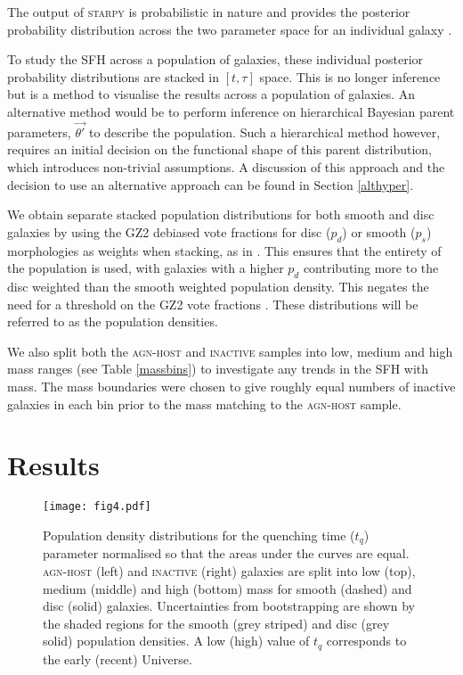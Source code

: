 \documentclass[useAMS,usenatbib]{mn2e}
\def\changed    {\color{nc} }
\def\changedbds    {\color{ncc} }
\def\secondchange    {\color{srv} }
\def\newref    {\color{new} }
\def\starpy ~{\textsc{starpy}}
\begin{document}
The output of \starpy  ~ is probabilistic in nature and provides the posterior probability distribution across the two parameter space for an individual galaxy {\newref \citep[the degeneracies for which can be seen in Figure 4 of]{Sme15} }. {\changed To study the SFH across a population of galaxies, these individual posterior probability distributions are {\secondchange stacked in $[t, \tau]$ space. This is no longer inference but is a method to visualise the results across a population of galaxies. An alternative method would be to perform inference on hierarchical Bayesian parent parameters, $\vec{\theta'}$ to describe the population. Such a hierarchical method however, requires an initial decision on the functional shape of this parent distribution, which introduces non-trivial assumptions. A discussion of this approach and the decision to use an alternative approach can be found in Section \ref{althyper}.}

We obtain separate stacked population distributions for both smooth and disc galaxies by using the GZ2 debiased vote fractions for disc ($p_d$) or smooth ($p_s$) morphologies as weights when stacking, as in \citet{Sme2015}. This ensures that the entirety of the population is used, with galaxies with a higher $p_d$ contributing more to the disc weighted than the smooth weighted population density. This negates the need for a threshold on the GZ2 vote fractions \citep[e.g., $p_d > 0.8$ as used in][]{Sch2014}. {\secondchange These distributions will be referred to as the population densities.}}


We also split both the \textsc{agn-host} and \textsc{inactive} samples into low, medium and high mass ranges (see Table \ref{massbins}) to investigate any trends in the SFH with mass. {\changed The mass boundaries were chosen to give roughly equal numbers of inactive galaxies in each bin prior to the mass matching to the \textsc{agn-host} sample.} 


\section{Results}

\begin{figure*}
\texttt{[image: fig4.pdf]}
\caption{{\secondchange Population density} distributions for the quenching time ($t_q$) parameter {\changedbds normalised so that the areas under the curves are equal}. \textsc{agn-host} (left) and \textsc{inactive} (right) galaxies are split into low (top), medium (middle) and high (bottom) mass for smooth (dashed) and disc (solid) galaxies. {\newref Uncertainties from bootstrapping are shown by the shaded regions for the smooth (grey striped) and disc (grey solid) population densities.} A low (high) value of $t_q$ corresponds to the early (recent) Universe.}
\label{time}
\end{figure*}
\end{document}
